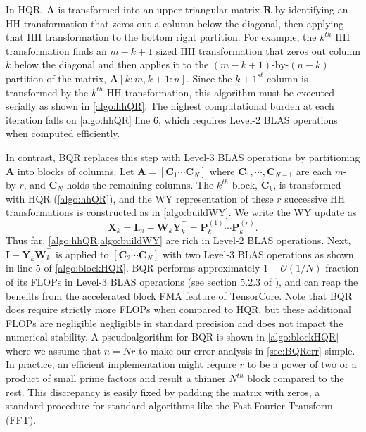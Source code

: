 \documentclass[review,onefignum,onetabnum]{siamart190516}
\newcommand{\bb}[1]{\mathbf{#1}}
\newcommand{\cO}{\mathcal{O}}
\begin{document}
In HQR, $\bb{A}$ is transformed into an upper triangular matrix $\bb{R}$ by identifying an HH transformation that zeros out a column below the diagonal, then applying that HH transformation to the bottom right partition. 
For example, the $k^{th}$ HH transformation finds an $m-k+1$ sized HH transformation that zeros out column $k$ below the diagonal and then applies it to the $(m-k+1)$-by-$(n-k)$ partition of the matrix, $\bb{A}[k:m,k+1:n]$.
Since the $k+1^{st}$ column is transformed by the $k^{th}$ HH transformation, this algorithm must be executed serially as shown in \cref{algo:hhQR}.
The highest computational burden at each iteration falls on \cref{algo:hhQR} line 6, which requires Level-2 BLAS operations when computed efficiently. \par

In contrast, BQR replaces this step with Level-3 BLAS operations by partitioning $\bb{A}$ into blocks of columns.
Let $\bb{A} = [\bb{C}_1 \cdots  \bb{C}_N]$ where $\bb{C}_1,\cdots,\bb{C}_{N-1}$ are each $m$-by-$r$, and $\bb{C}_N$ holds the remaining columns.
The $k^{th}$ block, $\bb{C}_k$, is transformed with HQR (\cref{algo:hhQR}), and the WY representation of these $r$ successive HH transformations is constructed as in \cref{algo:buildWY}.
We write the WY update as
\begin{equation}
	\bb{X}_k = \bb{I}_m -\bb{W}_{k}\bb{Y}_{k}^{\top} = \bb{P}_k^{(1)}\cdots\bb{P}_{k}^{(r)}.
\end{equation}
Thus far, \cref{algo:hhQR,algo:buildWY} are rich in Level-2 BLAS operations.
Next, $\bb{I} -\bb{Y}_{k}\bb{W}_{k}^{\top}$ is applied to $[\bb{C}_2 \cdots  \bb{C}_N]$ with two Level-3 BLAS operations as shown in line 5 of \cref{algo:blockHQR}.
BQR performs approximately $1-\cO(1/N)$ fraction of its FLOPs in Level-3 BLAS operations (see section 5.2.3 of \cite{golub2013matrix}), and can reap the benefits from the accelerated block FMA feature of TensorCore. 
Note that BQR does require strictly more FLOPs when compared to HQR, but these additional FLOPs are negligible negligible in standard precision and does not impact the numerical stability.
A pseudoalgorithm for BQR is shown in \cref{algo:blockHQR} where we assume that $n=Nr$ to make our error analysis in \cref{sec:BQRerr} simple.
In practice, an efficient implementation might require $r$ to be a power of two or a product of small prime factors and result a thinner $N^{th}$ block compared to the rest. 
This discrepancy is easily fixed by padding the matrix with zeros, a standard procedure for standard algorithms like the Fast Fourier Transform (FFT).
\end{document}
